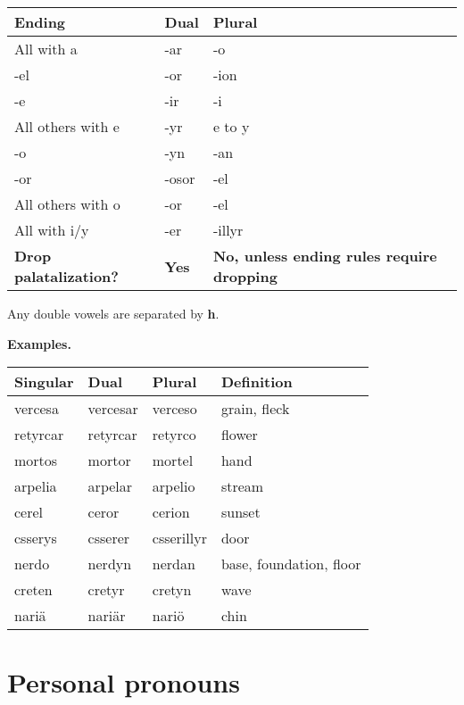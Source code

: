 \begin{center}
  \begin{tabular}{|p{4cm}|p{4cm}|p{4cm}|}
    \hline
    \textbf{Ending} & \textbf{Dual} & \textbf{Plural} \\ \hline
    All with a & -ar & -o \\ \hline
    -el & -or & -ion \\
    -e & -ir & -i \\
    All others with e & -yr & e to y \\ \hline
    -o & -yn & -an \\
    -or & -osor & -el \\
    All others with o & -or & -el \\ \hline
    All with i/y & -er & -illyr \\ \hline
    \textbf{Drop palatalization?} & \textbf{Yes} & \textbf{No, unless ending rules require dropping} \\ \hline
  \end{tabular}
\end{center}

Any double vowels are separated by \textbf{h}.

\textbf{Examples.}

\begin{center}
  \begin{tabular}{|l|l|l|l|}
    \hline
    \textbf{Singular} & \textbf{Dual} & \textbf{Plural} & \textbf{Definition} \\ \hline
    vercesa & vercesar & verceso & grain, fleck \\ \hline
    retyrcar & retyrcar & retyrco & flower \\ \hline
    mortos & mortor & mortel & hand \\ \hline
    arpelia & arpelar & arpelio & stream \\ \hline
    cerel & ceror & cerion & sunset \\ \hline
    csserys & csserer & csserillyr & door \\ \hline
    nerdo & nerdyn & nerdan & base, foundation, floor \\ \hline
    creten & cretyr & cretyn & wave \\ \hline
    nari\"a & nari\"ar & nari\"o & chin \\ \hline
  \end{tabular}
\end{center}

\section{Personal pronouns}

